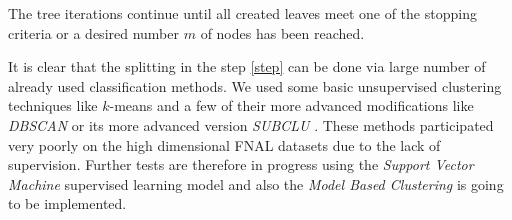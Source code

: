 \noindent The tree iterations continue until all created leaves meet one of the stopping criteria or a desired number $m$ of nodes has been reached. 

It is clear that the splitting in the step \ref{step} can be done via large number of already used classification methods. We used some basic unsupervised clustering techniques like $k$-means and a few of their more advanced modifications like  \emph{DBSCAN} \cite{Ester} or its more advanced version \emph{SUBCLU} \cite{Kailing}. These methods  participated very poorly on the high dimensional FNAL datasets due to the lack of supervision. Further tests are therefore in progress using the \emph{Support Vector Machine} supervised learning model and also the \emph{Model Based Clustering} is going to be implemented. 






